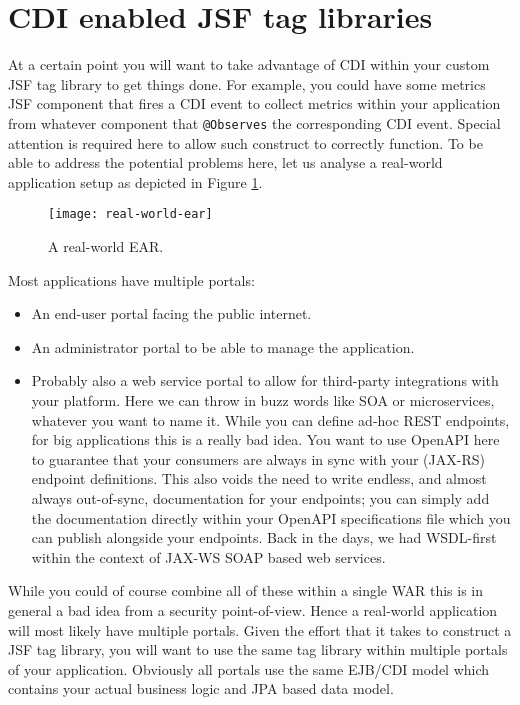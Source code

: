 \section{CDI enabled JSF tag libraries}
At a certain point you will want to take advantage of CDI within your custom JSF tag library to get things done.
For example, you could have some metrics JSF component that fires a CDI event to collect metrics within your application from whatever component that \texttt{@Observes} the corresponding CDI event.
Special attention is required here to allow such construct to correctly function.
To be able to address the potential problems here, let us analyse a real-world application setup as depicted in Figure \ref{fig:real-world-ear}.
\begin{figure}[htbp]
	\begin{center}
		\texttt{[image: real-world-ear]}
		\caption{A real-world EAR.}
		\label{fig:real-world-ear}
	\end{center}
\end{figure}
Most applications have multiple portals:
\begin{itemize}
	\item An end-user portal facing the public internet.
	\item An administrator portal to be able to manage the application.
	\item Probably also a web service portal to allow for third-party integrations with your platform.
	Here we can throw in buzz words like SOA or microservices, whatever you want to name it.
	While you can define ad-hoc REST endpoints, for big applications this is a really bad idea.
	You want to use OpenAPI here to guarantee that your consumers are always in sync with your (JAX-RS) endpoint definitions.
	This also voids the need to write endless, and almost always out-of-sync, documentation for your endpoints; you can simply add the documentation directly within your OpenAPI specifications file which you can publish alongside your endpoints.
	Back in the days, we had WSDL-first within the context of JAX-WS SOAP based web services.
\end{itemize}
While you could of course combine all of these within a single WAR this is in general a bad idea from a security point-of-view.
Hence a real-world application will most likely have multiple portals.
Given the effort that it takes to construct a JSF tag library, you will want to use the same tag library within multiple portals of your application.
Obviously all portals use the same EJB/CDI model which contains your actual business logic and JPA based data model.
